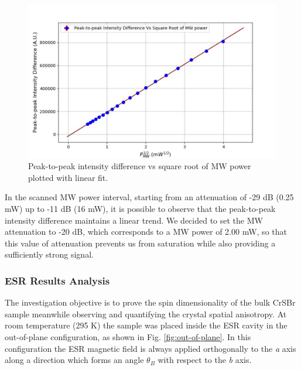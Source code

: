 \documentclass[journal]{IEEEtran}
\begin{document}
\begin{figure}[h!]
    \centering
    \includegraphics[width=\linewidth]{Lab2-MW_Power.png}
    \caption{Peak-to-peak intensity difference vs square root of MW power plotted with linear fit.}
    \label{fig:MW_Power}
\end{figure}

\noindent In the scanned MW power interval, starting from an attenuation of -29 dB (0.25 mW) up to -11 dB (16 mW), it is possible to observe that the peak-to-peak intensity difference maintains a linear trend. We decided to set the MW attenuation to -20 dB, which corresponds to a MW power of 2.00 mW, so that this value of attenuation prevents us from saturation while also providing a sufficiently strong signal.

\subsubsection{ESR Results Analysis}

The investigation objective is to prove the spin dimensionality of the bulk CrSBr sample meanwhile observing and quantifying the crystal spatial anisotropy. At room temperature (295 K) the sample was placed inside the ESR cavity in the out-of-plane configuration, as shown in Fig. \ref{fig:out-of-plane}. In this configuration the ESR magnetic field is always applied orthogonally to the \textit{a} axis along a direction which forms an angle $\theta_B$ with respect to the \textit{b} axis. 
\end{document}

